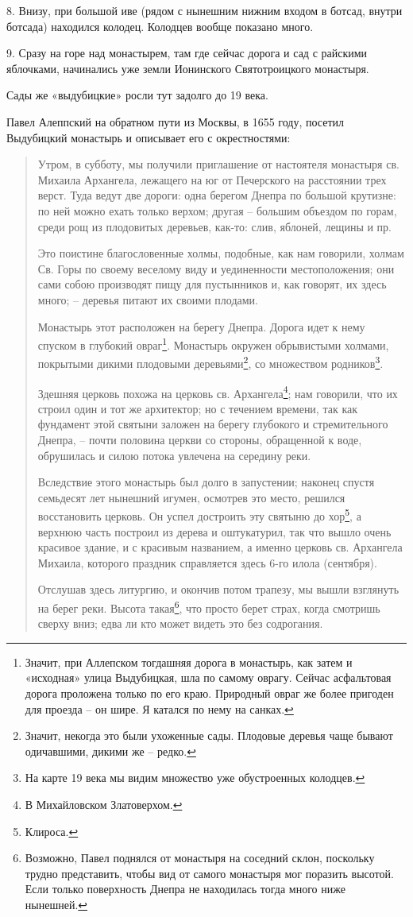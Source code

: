 8. Внизу, при большой иве (рядом с нынешним нижним входом в ботсад, внутри ботсада) находился колодец. Колодцев вообще показано много.

9. Сразу на горе над монастырем, там где сейчас дорога и сад с райскими яблочками, начинались уже земли Ионинского Святотроицкого монастыря.

Сады же «выдубицкие» росли тут задолго до 19 века.

Павел Алеппский на обратном пути из Москвы, в 1655 году, посетил Выдубицкий монастырь и описывает его с окрестностями:

\begin{quotation}  
Утром, в субботу, мы получили приглашение от настоятеля монастыря св. Михаила Архангела, лежащего на юг от Печерского на расстоянии трех верст. Туда ведут две дороги: одна берегом Днепра по большой крутизне: по ней можно ехать только верхом; другая – большим объездом по горам, среди рощ из плодовитых деревьев, как-то: слив, яблоней, лещины и пр. 

Это поистине благословенные холмы, подобные, как нам говорили, холмам Св. Горы по своему веселому виду и уединенности местоположения; они сами собою производят пищу для пустынников и, как говорят, их здесь много; – деревья питают их своими плодами.

Монастырь этот расположен на берегу Днепра. Дорога идет к нему спуском в глубокий овраг\footnote{Значит, при Аллепском тогдашняя дорога в монастырь, как затем и «исходная» улица Выдубицкая, шла по самому оврагу. Сейчас асфальтовая дорога проложена только по его краю. Природный овраг же более пригоден для проезда – он шире. Я катался по нему на санках.}. Монастырь окружен обрывистыми холмами, покрытыми дикими плодовыми деревьями\footnote{Значит, некогда это были ухоженные сады. Плодовые деревья чаще бывают одичавшими, дикими же – редко.}, со множеством родников\footnote{На карте 19 века мы видим множество уже обустроенных колодцев.}.

Здешняя церковь похожа на церковь св. Архангела\footnote{В Михайловском Златоверхом.}; нам говорили, что их строил один и тот же архитектор; но с течением времени, так как фундамент этой святыни заложен на берегу глубокого и стремительного Днепра, – почти половина церкви со стороны, обращенной к воде, обрушилась и силою потока увлечена на середину реки.

Вследствие этого монастырь был долго в запустении; наконец спустя семьдесят лет нынешний игумен, осмотрев это место, решился восстановить церковь. Он успел достроить эту святыню до хор\footnote{Клироса.}, а верхнюю часть построил из дерева и оштукатурил, так что вышло очень красивое здание, и с красивым названием, а именно церковь св. Архангела Михаила, которого праздник справляется здесь 6-го илола (сентября).

Отслушав здесь литургию, и окончив потом трапезу, мы вышли взглянуть на берег реки. Высота такая\footnote{Возможно, Павел поднялся от монастыря на соседний склон, поскольку трудно представить, чтобы вид от самого монастыря мог поразить высотой. Если только поверхность Днепра не находилась тогда много ниже нынешней.}, что просто берет страх, когда смотришь сверху вниз; едва ли кто может видеть это без содрогания.
\end{quotation}  
